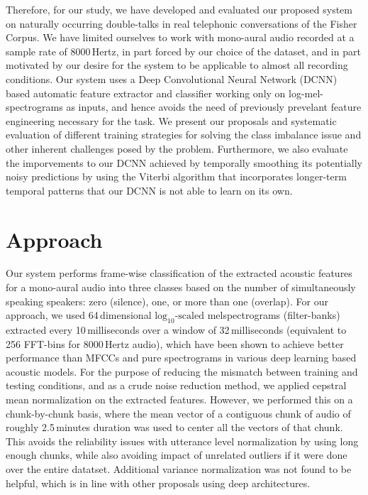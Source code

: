\documentclass[a4paper]{article}
\begin{document}
Therefore, for our study, we have developed and evaluated our proposed system on naturally occurring double-talks in real telephonic conversations of the Fisher Corpus.  %
We have limited ourselves to work with mono-aural audio recorded at a sample rate of 8000\,Hertz,
in part forced by our choice of the dataset,
and in part motivated by our desire for the system to be applicable to almost all recording conditions.
Our system uses a Deep Convolutional Neural Network (DCNN) based automatic feature extractor and classifier working only on log-mel-spectrograms as inputs,
and hence avoids the need of previously prevelant feature engineering necessary for the task.
We present our proposals and systematic evaluation of different training strategies for solving the class imbalance issue and other inherent challenges posed by the problem.
Furthermore, we also evaluate the imporvements to our DCNN achieved by temporally smoothing its potentially noisy predictions
by using the Viterbi algorithm that incorporates longer-term temporal patterns that our DCNN is not able to learn on its own.

\section{Approach}
Our system performs frame-wise classification of the extracted acoustic features for a mono-aural audio into three classes based on the number of simultaneously speaking speakers:
zero (silence), one, or more than one (overlap).
For our approach, we used 64\,dimensional $\text{log}_{10} \text{-scaled}$ melspectrograms (filter-banks)
extracted every 10\,milliseconds over a window of 32\,milliseconds (equivalent to 256 FFT-bins for 8000\,Hertz audio),
which have been shown to achieve better performance than MFCCs and pure spectrograms in various deep learning based acoustic models.  %
For the purpose of reducing the mismatch between training and testing conditions, and as a crude noise reduction method,
we applied cepstral mean normalization on the extracted features.
However, we performed this on a chunk-by-chunk basis,
where the mean vector of a contiguous chunk of audio of roughly 2.5\,minutes duration was used to center all the vectors of that chunk.
This avoids the reliability issues with utterance level normalization by using long enough chunks,
while also avoiding impact of unrelated outliers if it were done over the entire datatset.
Additional variance normalization was not found to be helpful,
which is in line with other proposals using deep architectures.  %
\end{document}
